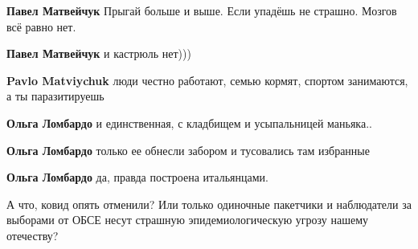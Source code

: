 \begin{itemize}
\begin{itemize}
\textbf{Павел Матвейчук} Прыгай больше и выше. Если упадёшь не страшно. Мозгов всё равно нет.

 
\textbf{Павел Матвейчук} и кастрюль нет)))

 
\textbf{Pavlo Matviychuk} люди честно работают, семью кормят, спортом занимаются, а ты паразитируешь

 
\textbf{Ольга Ломбардо} и единственная, с кладбищем и усыпальницей маньяка..

 
\textbf{Ольга Ломбардо} только ее обнесли забором и тусовались там избранные

 
\textbf{Ольга Ломбардо} да, правда построена итальянцами.
\end{itemize}

 

А что, ковид опять отменили? Или только одиночные пакетчики и наблюдатели за
выборами от ОБСЕ несут страшную эпидемиологическую угрозу нашему отечеству?
🤦


\end{itemize}
